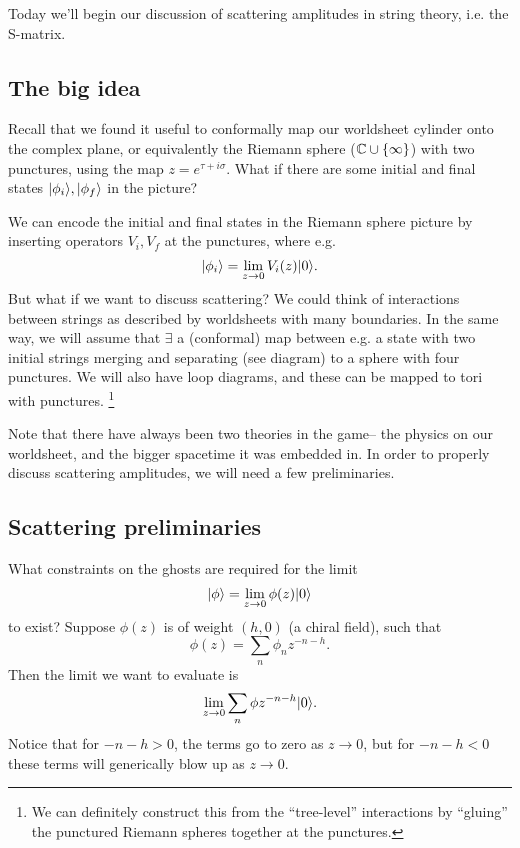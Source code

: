 Today we'll begin our discussion of scattering amplitudes in string theory, i.e. the S-matrix.

\subsection*{The big idea}
Recall that we found it useful to conformally map our worldsheet cylinder onto the complex plane, or equivalently the Riemann sphere ($\mathbb{C} \cup \{\infty\}$) with two punctures, using the map $z=e^{\tau + i\sigma}$. What if there are some initial and final states $\lvert\phi_i\rangle,\lvert\phi_f\rangle$ in the picture?

We can encode the initial and final states in the Riemann sphere picture by inserting operators $V_i,V_f$ at the punctures, where e.g.
\begin{equation}
    \lvert\phi_i\rangle=\lim_{z\to 0} V_i(z) \lvert0\rangle.
\end{equation}
But what if we want to discuss scattering? We could think of interactions between strings as described by worldsheets with many boundaries. In the same way, we will assume that $\exists$ a (conformal) map between e.g. a state with two initial strings merging and separating (see diagram) to a sphere with four punctures. 
We will also have loop diagrams, and these can be mapped to tori with punctures.%
    \footnote{We can definitely construct this from the ``tree-level'' interactions by ``gluing'' the punctured Riemann spheres together at the punctures.}

Note that there have always been two theories in the game-- the physics on our worldsheet, and the bigger spacetime it was embedded in. In order to properly discuss scattering amplitudes, we will need a few preliminaries.

\subsection*{Scattering preliminaries}
What constraints on the ghosts are required for the limit
\begin{equation}
    \lvert\phi\rangle=\lim_{z\to 0} \phi(z) \lvert0\rangle
\end{equation}
to exist? Suppose $\phi(z)$ is of weight $(h,0)$ (a chiral field), such that
\begin{equation}
    \phi(z) = \sum_n \phi_n z^{-n-h}.
\end{equation}
Then the limit we want to evaluate is
\begin{equation}
    \lim_{z\to 0} \sum_n \phi z^{-n -h} \lvert0\rangle.
\end{equation}
Notice that for $-n-h >0$, the terms go to zero as $z\to 0$, but for $-n-h <0$ these terms will generically blow up as $z\to 0$.


